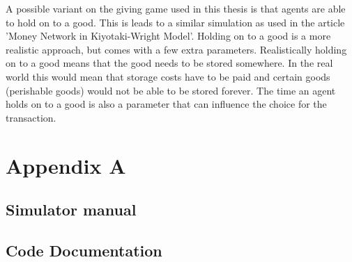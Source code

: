 \documentclass[twoside,openright]{uva-bachelor-thesis}
\begin{document}
A possible variant on the giving game used in this thesis is that agents are able to hold on to a good. This is leads to a similar simulation as used in the article 'Money Network in Kiyotaki-Wright Model'. Holding on to a good is a more realistic approach, but comes with a few extra parameters. Realistically holding on to a good means that the good needs to be stored somewhere. In the real world this would mean that storage costs have to be paid and certain goods (perishable goods) would not be able to be stored forever. The time an agent holds on to a good is also a parameter that can influence the choice for the transaction.

\chapter{Appendix A}

\section{Simulator manual}

\section{Code Documentation}
\end{document}
